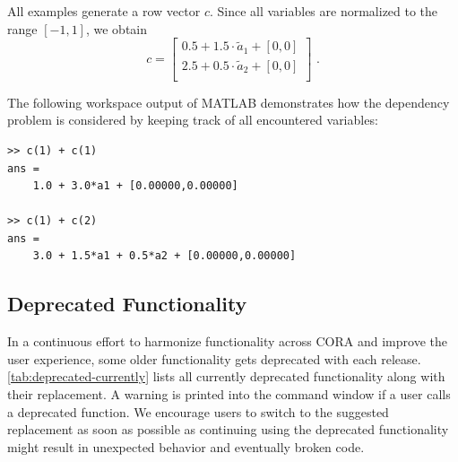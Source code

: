 All examples generate a row vector $c$. Since all variables are normalized to the range $[-1,1]$, we obtain
$$
c =
\begin{bmatrix}
    0.5 + 1.5 \cdot \tilde{a}_1 + [0,0] \\
    2.5 + 0.5 \cdot \tilde{a}_2 + [0,0] \\
\end{bmatrix}
\text{~.}
$$

The following workspace output of MATLAB demonstrates how the dependency problem is considered by keeping track of all encountered variables:
\begin{Verbatim}[samepage=true]
>> c(1) + c(1)
ans = 
	1.0 + 3.0*a1 + [0.00000,0.00000]

>> c(1) + c(2)
ans = 
	3.0 + 1.5*a1 + 0.5*a2 + [0.00000,0.00000]
\end{Verbatim}

\subsection{Deprecated Functionality}\label{sec:deprecated-functionality}

In a continuous effort to harmonize functionality across CORA and improve the user experience,
some older functionality gets deprecated with each release.
\cref{tab:deprecated-currently} lists all currently deprecated functionality along with their replacement.
A warning is printed into the command window if a user calls a deprecated function.
We encourage users to switch to the suggested replacement as soon as possible
as continuing using the deprecated functionality might result in unexpected behavior and eventually broken code.

